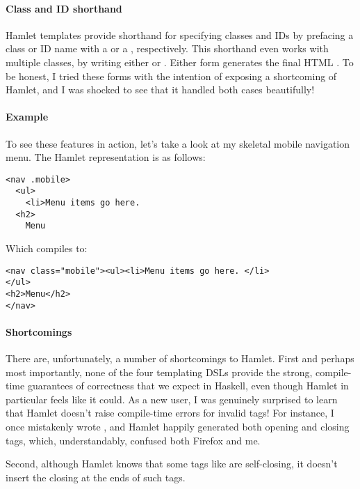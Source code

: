 \paragraph{Class and ID shorthand} Hamlet templates provide shorthand for specifying classes and IDs by prefacing a class or ID name with a  or a \code{\#}, respectively. This shorthand even works with multiple classes, by writing either  or . Either form generates the final HTML . To be honest, I tried these forms with the intention of exposing a shortcoming of Hamlet, and I was shocked to see that it handled both cases beautifully!

\paragraph{Example} To see these features in action, let's take a look at my skeletal mobile navigation menu. The Hamlet representation is as follows: 

\begin{Verbatim}[samepage=true]
<nav .mobile>
  <ul>
    <li>Menu items go here. 
  <h2>
    Menu
\end{Verbatim}

Which compiles to:

\begin{Verbatim}[samepage=true]
<nav class="mobile"><ul><li>Menu items go here. </li>
</ul>
<h2>Menu</h2>
</nav>
\end{Verbatim}

\paragraph{Shortcomings} There are, unfortunately, a number of shortcomings to Hamlet. First and perhaps most importantly, none of the four templating DSLs provide the strong, compile-time guarantees of correctness that we expect in Haskell, even though Hamlet in particular feels like it could. As a new user, I was genuinely surprised to learn that Hamlet doesn't raise compile-time errors for invalid tags! For instance, I once mistakenly wrote , and Hamlet happily generated both opening and closing  tags, which, understandably, confused both Firefox and me.

Second, although Hamlet knows that some tags like  are self-closing, it doesn't insert the closing \code{/} at the ends of such tags.

